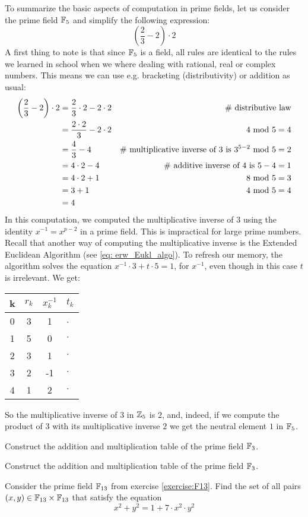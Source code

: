 \begin{example}\label{prime-field-F5}
To summarize the basic aspects of computation in prime fields, let us consider the prime field $\mathbb{F}_5$ and simplify the following expression:
$$\left(\frac{2}{3} - 2\right)\cdot 2 $$
A first thing to note is that since $\mathbb{F}_5$ is a field, all rules are identical to the rules we learned in school when we where dealing with rational, real or complex numbers. This means we can use e.g.  bracketing (distributivity) or addition as usual:
\begin{align*}
\left(\frac{2}{3} - 2\right)\cdot 2 &=
 \frac{2}{3}\cdot 2 - 2\cdot 2 & \text{\# distributive law}\\
 &= \frac{2\cdot 2}{3} - 2\cdot 2 & 4 \text{ mod } 5=4 \\
 &= \frac{4}{3} - 4 & \text{\# multiplicative inverse of 3 is } 3^{5-2} \text{ mod } 5=2\\
 &= 4\cdot 2 - 4 & \text{\# additive inverse of 4 is } 5-4=1\\
 &= 4\cdot 2 +1 & 8 \text{ mod } 5=3\\
 &= 3 +1 & 4 \text{ mod } 5=4\\
 &= 4
\end{align*}
In this computation, we computed the multiplicative inverse of $3$ using the identity
$x^{-1}=x^{p-2}$ in a prime field. This is impractical for large prime numbers. Recall that another way of computing the multiplicative inverse is the Extended Euclidean Algorithm (see \ref{eq: erw_Eukl_algo}).  To refresh our memory, the algorithm solves the equation $x^{-1}\cdot 3 + t \cdot 5 =1$, for $x^{-1}$, even though in this case $t$ is irrelevant. We get:
\begin{center}
  \begin{tabular}{c | c c l}
    k & $ r_k $ & $ x^{-1}_k $ & $ t_k $ \\\hline
    0 & 3 & 1 & $\cdot$\ \\
    1 & 5 & 0 & $\cdot$ \\
    2 & 3 & 1 & $\cdot$ \\
    3 & 2 &-1 & $\cdot$ \\
    4 & 1 & 2  & $\cdot$ \\
  \end{tabular}
\end{center}
So the multiplicative inverse of $3$ in $\mathbb{Z}_5$ is $2$, and, indeed, if we compute the product of $3$ with its multiplicative inverse $2$ we get the neutral element $1$ in $\mathbb{F}_5$.
\end{example}
\begin{exercise}\label{exercise:F3} Construct the addition and multiplication table of the prime field $\mathbb{F}_3$.
\end{exercise}
\begin{exercise}\label{prime_field_F13} Construct the addition and multiplication table of the prime field $\mathbb{F}_3$.
\end{exercise}
\begin{exercise} Consider the prime field $\mathbb{F}_{13}$ from exercise \ref{exercise:F13}. Find the set of all pairs $(x,y)\in \mathbb{F}_{13}\times \mathbb{F}_{13}$ that satisfy the equation
$$
x^2+y^2 = 1 + 7\cdot x^2\cdot y^2
$$
\end{exercise}
